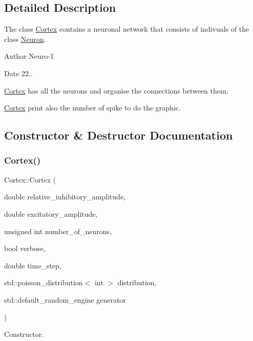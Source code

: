 \subsection{Detailed Description}
The class \hyperlink{class_cortex}{Cortex} contains a neuronal network that consists of indivuals of the class \hyperlink{class_neuron}{Neuron}. 

\begin{DoxyAuthor}{Author}
Neuro-\/1
\end{DoxyAuthor}
\begin{DoxyDate}{Date}
22..
\end{DoxyDate}
\hyperlink{class_cortex}{Cortex} has all the neurons and organise the connections between them.

\hyperlink{class_cortex}{Cortex} print also the number of spike to do the graphic. 

\subsection{Constructor \& Destructor Documentation}
\hypertarget{class_cortex_a1a58ad159553ce6da6fff6daa400f296}{}\label{class_cortex_a1a58ad159553ce6da6fff6daa400f296} 
\subsubsection{\texorpdfstring{Cortex()}{Cortex()}}
{\footnotesize\ttfamily Cortex\+::\+Cortex (\begin{DoxyParamCaption}\item[{double}]{relative\+\_\+inhibitory\+\_\+amplitude,  }\item[{double}]{excitatory\+\_\+amplitude,  }\item[{unsigned int}]{number\+\_\+of\+\_\+neurons,  }\item[{bool}]{verbose,  }\item[{double}]{time\+\_\+step,  }\item[{std\+::poisson\+\_\+distribution$<$ int $>$}]{distribution,  }\item[{std\+::default\+\_\+random\+\_\+engine}]{generator }\end{DoxyParamCaption})}



Constructor. 


